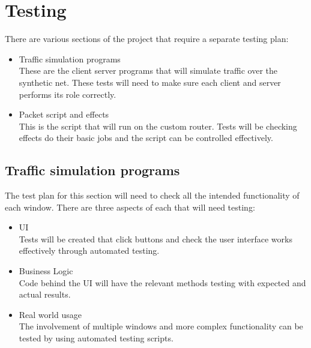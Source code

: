 
\section{Testing}
There are various sections of the project that require a separate testing plan:

\begin{itemize}

	\item Traffic simulation programs\\
	These are the client server programs that will simulate traffic over the synthetic net. These tests will need to 	make 	sure each client and server performs its role correctly.
	
	\item Packet script and effects\\
	This is the script that will run on the custom router. Tests will be checking effects do their basic jobs and the script can be controlled effectively.
	
\end{itemize}

\subsection{Traffic simulation programs}
The test plan for this section will need to check all the intended functionality of each window. There are three aspects of each that will need testing:

\begin{itemize}

	\item UI \\
	Tests will be created that click buttons and check the user interface works effectively through automated testing.

	\item Business Logic \\
	Code behind the UI will have the relevant methods testing with expected and actual results.

	\item Real world usage \\
	The involvement of multiple windows and more complex functionality can be tested by using automated testing 			scripts.
	
\end{itemize}

